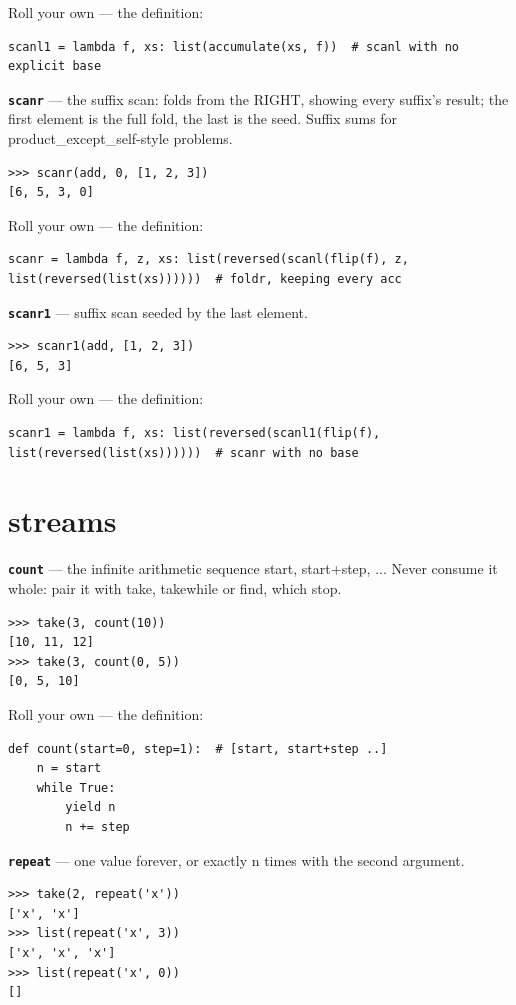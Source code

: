 \documentclass[10pt,letterpaper]{article}
\begin{document}
Roll your own --- the definition:

\begin{lstlisting}[style=ex]
scanl1 = lambda f, xs: list(accumulate(xs, f))  # scanl with no explicit base
\end{lstlisting}
\textbf{\texttt{scanr}} --- the suffix scan: folds from the RIGHT, showing every suffix's result; the first element is the full fold, the last is the seed. Suffix sums for product\_except\_self-style problems.
\begin{lstlisting}[style=ex]
>>> scanr(add, 0, [1, 2, 3])
[6, 5, 3, 0]
\end{lstlisting}

Roll your own --- the definition:

\begin{lstlisting}[style=ex]
scanr = lambda f, z, xs: list(reversed(scanl(flip(f), z, list(reversed(list(xs))))))  # foldr, keeping every acc
\end{lstlisting}
\textbf{\texttt{scanr1}} --- suffix scan seeded by the last element.
\begin{lstlisting}[style=ex]
>>> scanr1(add, [1, 2, 3])
[6, 5, 3]
\end{lstlisting}

Roll your own --- the definition:

\begin{lstlisting}[style=ex]
scanr1 = lambda f, xs: list(reversed(scanl1(flip(f), list(reversed(list(xs))))))  # scanr with no base
\end{lstlisting}

\section{streams}
\textbf{\texttt{count}} --- the infinite arithmetic sequence start, start+step, ... Never consume it whole: pair it with take, takewhile or find, which stop.
\begin{lstlisting}[style=ex]
>>> take(3, count(10))
[10, 11, 12]
>>> take(3, count(0, 5))
[0, 5, 10]
\end{lstlisting}

Roll your own --- the definition:

\begin{lstlisting}[style=ex]
def count(start=0, step=1):  # [start, start+step ..]
    n = start
    while True:
        yield n
        n += step
\end{lstlisting}
\textbf{\texttt{repeat}} --- one value forever, or exactly n times with the second argument.
\begin{lstlisting}[style=ex]
>>> take(2, repeat('x'))
['x', 'x']
>>> list(repeat('x', 3))
['x', 'x', 'x']
>>> list(repeat('x', 0))
[]
\end{lstlisting}
\end{document}
